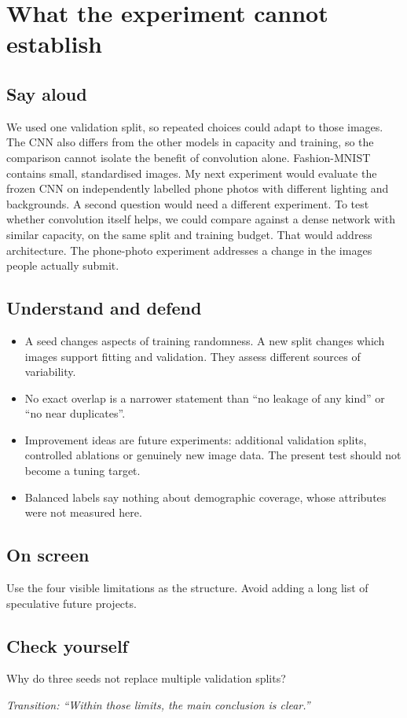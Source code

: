\documentclass[11pt,a4paper]{article}
\newcommand{\slide}[3]{\clearpage{\small\color{olive}SLIDE #1\hfill Target: #3}\par\section{#2}}
\newcommand{\say}{\subsection{Say aloud}}
\newcommand{\understand}{\subsection{Understand and defend}}
\newcommand{\screen}{\subsection{On screen}}
\newcommand{\selfcheck}[1]{\subsection{Check yourself}#1}
\newcommand{\transition}[1]{\par\smallskip\textit{Transition: #1}}
\newcounter{question}
\begin{document}
\slide{15}{What the experiment cannot establish}{50 seconds}
\say
We used one validation split, so repeated choices could adapt to those images. The CNN also differs from the other models in capacity and training, so the comparison cannot isolate the benefit of convolution alone. Fashion-MNIST contains small, standardised images. My next experiment would evaluate the frozen CNN on independently labelled phone photos with different lighting and backgrounds. A second question would need a different experiment. To test whether convolution itself helps, we could compare against a dense network with similar capacity, on the same split and training budget. That would address architecture. The phone-photo experiment addresses a change in the images people actually submit.
\understand
\begin{itemize}
\item A seed changes aspects of training randomness. A new split changes which images support fitting and validation. They assess different sources of variability.
\item No exact overlap is a narrower statement than ``no leakage of any kind'' or ``no near duplicates''.
\item Improvement ideas are future experiments: additional validation splits, controlled ablations or genuinely new image data. The present test should not become a tuning target.
\item Balanced labels say nothing about demographic coverage, whose attributes were not measured here.
\end{itemize}
\screen
Use the four visible limitations as the structure. Avoid adding a long list of speculative future projects.
\selfcheck{Why do three seeds not replace multiple validation splits?}
\transition{``Within those limits, the main conclusion is clear.''}
\end{document}
